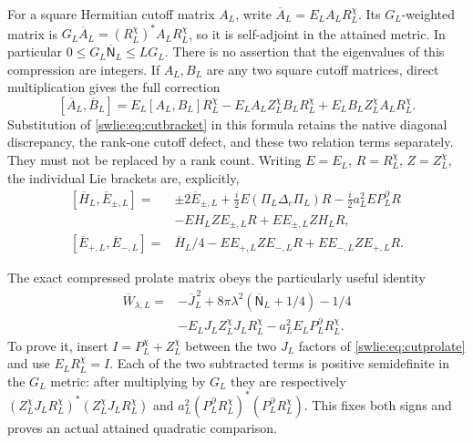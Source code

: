 For a square Hermitian cutoff matrix $A_L$, write
$\overline A_L=E_LA_LR_L^\chi$. Its $G_L$-weighted
matrix is
$G_L\overline A_L=(R_L^\chi)^*A_LR_L^\chi$, so it is
self-adjoint in the attained metric. In particular
$0\leq G_L\overline{\mathsf N}_L\leq L G_L$.
There is no assertion that the eigenvalues of this
compression are integers.
If $A_L,B_L$ are any two square cutoff matrices,
direct multiplication gives the full correction
\begin{equation}\label{swlie:eq:compressedbracket}
 [\overline A_L,\overline B_L]
  =E_L[A_L,B_L]R_L^\chi
    -E_LA_LZ_L^\chi B_LR_L^\chi
    +E_LB_LZ_L^\chi A_LR_L^\chi.
\end{equation}
Substitution of \eqref{swlie:eq:cutbracket} in this formula
retains the native diagonal discrepancy, the rank-one
cutoff defect, and these two relation terms separately.
They must not be replaced by a rank count.
Writing $E=E_L$, $R=R_L^\chi$, $Z=Z_L^\chi$,
the individual Lie brackets are, explicitly,
\begin{equation}\label{swlie:eq:quotientlie}
 \begin{aligned}
 [\overline H_L,\overline E_{\pm,L}]
 ={}&\pm2\overline E_{\pm,L}
   +\tfrac i2E(\Pi_L\Delta_c\Pi_L)R
   -\tfrac i2a_L^2EP_L^\partial R\\
 &-EH_LZE_{\pm,L}R+EE_{\pm,L}ZH_LR,\\
 [\overline E_{+,L},\overline E_{-,L}]
 ={}&\overline H_L/4
       -EE_{+,L}ZE_{-,L}R+EE_{-,L}ZE_{+,L}R .
 \end{aligned}
\end{equation}

The exact compressed prolate matrix obeys the particularly
useful identity
\begin{equation}\label{swlie:eq:compressedprolate}
 \begin{split}
 \overline W_{\lambda,L}
 ={}&-\overline J_L^{\,2}
       +8\pi\lambda^2(\overline{\mathsf N}_L+1/4)-1/4\\
 &-E_LJ_LZ_L^\chi J_LR_L^\chi
       -a_L^2E_LP_L^\partial R_L^\chi .
 \end{split}
\end{equation}
To prove it, insert $I=P_L^\chi+Z_L^\chi$
between the two $J_L$ factors of \eqref{swlie:eq:cutprolate}
and use $E_LR_L^\chi=I$.
Each of the two subtracted terms is positive
semidefinite in the $G_L$ metric: after multiplying
by $G_L$ they are respectively
$(Z_L^\chi J_LR_L^\chi)^*(Z_L^\chi J_LR_L^\chi)$
and $a_L^2(P_L^\partial R_L^\chi)^*
                           (P_L^\partial R_L^\chi)$.
This fixes both signs and proves an actual attained
quadratic comparison.

